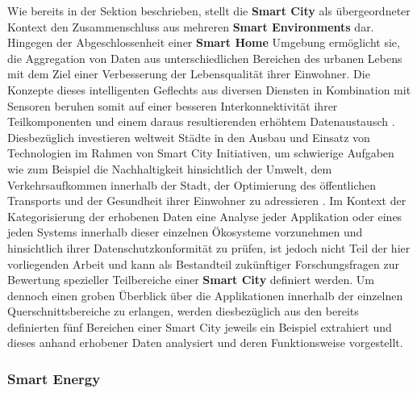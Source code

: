 Wie bereits in der Sektion  beschrieben, stellt die \textbf{Smart City} als übergeordneter Kontext den Zusammenschluss aus mehreren \textbf{Smart Environments} dar. Hingegen der Abgeschlossenheit einer \textbf{Smart Home} Umgebung ermöglicht sie, die Aggregation von Daten aus unterschiedlichen Bereichen des urbanen Lebens mit dem Ziel einer Verbesserung der Lebensqualität ihrer Einwohner. 
Die Konzepte dieses intelligenten Geflechts aus diversen Diensten in Kombination mit Sensoren beruhen somit auf einer besseren Interkonnektivität ihrer Teilkomponenten und einem daraus resultierenden erhöhtem Datenaustausch \cite{Stefanouli2019}. 
Diesbezüglich investieren weltweit Städte in den Ausbau und Einsatz von Technologien im Rahmen von Smart City Initiativen, um schwierige Aufgaben wie zum Beispiel die Nachhaltigkeit hinsichtlich der Umwelt, dem Verkehrsaufkommen innerhalb der Stadt, der Optimierung des öffentlichen Transports und der Gesundheit ihrer Einwohner zu adressieren \cite{BCG2020}.
Im Kontext der Kategorisierung der erhobenen Daten eine Analyse jeder Applikation oder eines jeden Systems innerhalb dieser einzelnen Ökosysteme vorzunehmen und hinsichtlich ihrer Datenschutzkonformität zu prüfen, ist jedoch nicht Teil der hier vorliegenden Arbeit und kann als Bestandteil zukünftiger Forschungsfragen zur Bewertung spezieller Teilbereiche einer \textbf{Smart City} definiert werden.
Um dennoch einen groben Überblick über die Applikationen innerhalb der einzelnen Querschnittsbereiche zu erlangen, werden diesbezüglich aus den bereits definierten fünf Bereichen einer Smart City jeweils ein Beispiel extrahiert und dieses anhand erhobener Daten analysiert und deren Funktionsweise vorgestellt.\\

\subsubsection{Smart Energy}
\label{sec:Analyse der Datenerhebung:ssec:Smart City:sssec:Smart Energy}

